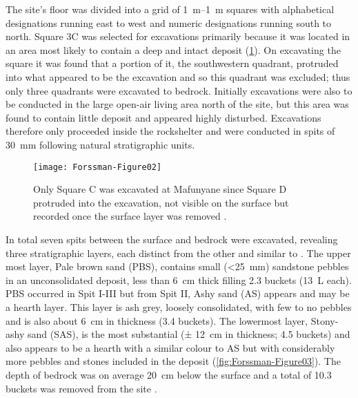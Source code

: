 The site’s floor was  divided into a grid of \SIrange{1}{1}{\meter} squares with alphabetical designations running east to west and numeric designations running south to north. 
Square 3C was selected for excavations primarily because it was located in an area most likely to contain a deep and intact deposit (\cref{fig:Forssman-Figure02}). 
On excavating the square it was found that a portion of it, the southwestern quadrant, protruded into what appeared to be the \textcite{Walker_1994} excavation and so this quadrant was excluded; 
thus only three quadrants were excavated to bedrock. Initially excavations were also to be conducted in the large open-air living area north of the site, but this area was found to contain little deposit and appeared highly disturbed. 
Excavations therefore only proceeded inside the rockshelter and were conducted in spits of \SI{30}{\milli\meter} following natural stratigraphic units.

	\begin{figure}
		\texttt{[image: Forssman-Figure02]}
		\caption{Only Square C was excavated at Mafunyane since Square D protruded into the \textcite{Walker_1994} excavation, not visible on the surface but recorded once the surface layer was removed \parencite[from][96]{Forssman_2014a}.}
		\label{fig:Forssman-Figure02}
	\end{figure}

In total seven spits between the surface and bedrock were excavated, revealing three stratigraphic layers, each distinct from the other and similar to \textcite{Walker_1994}. 
The upper most layer, Pale brown sand (PBS), contains small (<\SI{25}{\milli\meter}) sandstone pebbles in an unconsolidated deposit,
 less than \SI{6}{\centi\meter} thick filling \num{2,3} buckets (\SI{13}{\liter} each). 
PBS occurred in Spit I-III but from Spit II, Ashy sand (AS) appears and may be a hearth layer. 
This layer is ash grey, loosely consolidated, with few to no pebbles and is also about \SI{6}{\centi\meter} in thickness (\num{3.4} buckets). 
The lowermost layer, Stony-ashy sand (SAS), is the most substantial (± \SI{12}{\centi\meter} in thickness; \num{4.5} buckets) and also appears to be a hearth with a similar colour to AS but with considerably more pebbles and stones included in the deposit (\cref{fig:Forssman-Figure03}). The depth of bedrock was on average \SI{20}{\centi\meter} below the surface and a total of \num{10.3} buckets was removed from the site \parencite[for more details see][95]{Forssman_2014a}. 

